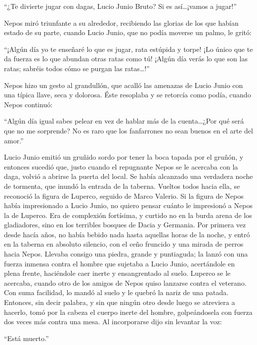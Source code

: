 \documentclass[11pt,openany]{book}
\begin{document}
“¿Te divierte jugar con dagas, Lucio Junio Bruto? Si es así\dots ¡vamos a jugar!” 

Nepos miró triunfante a su alrededor, recibiendo las glorias de los que habían estado de su parte, cuando Lucio Junio, que no podía moverse un palmo, le gritó: 

“¡Algún día yo te enseñaré lo que es jugar, rata estúpida y torpe! ¡Lo único que te da fuerza es lo que abundan otras ratas como tú! ¡Algún día verás lo que son las ratas; sabréis todos cómo se purgan las ratas\dots!” 

Nepos hizo un gesto al grandullón, que acalló las amenazas de Lucio Junio con una típica llave, seca y dolorosa. Éste resoplaba y se retorcía como podía, cuando Nepos continuó: 

“Algún día igual sabes pelear en vez de hablar más de la cuenta\dots ¿Por qué será que no me sorprende? No es raro que los fanfarrones no sean buenos en el arte del amor.” 

Lucio Junio emitió un gruñido sordo por tener la boca tapada por el gruñón, y entonces sucedió que, justo cuando el repugnante Nepos se le acercaba con la daga, volvió a abrirse la puerta del local. Se había alcanzado una verdadera noche de tormenta, que inundó la entrada de la taberna. Vueltos todos hacia ella, se reconoció la figura de Luperco, seguido de Marco Valerio. Si la figura de Nepos había impresionado a Lucio Junio, no quiero pensar cuánto le impresionó a Nepos la de Luperco. Era de complexión fortísima, y curtido no en la burda arena de los gladiadores, sino en los terribles bosques de Dacia y Germania. Por primera vez desde hacía años, no había bebido nada hasta aquellas horas de la noche, y entró en la taberna en absoluto silencio, con el ceño fruncido y una mirada de perros hacia Nepos. Llevaba consigo una piedra, grande y puntiaguda; la lanzó con una fuerza inmensa contra el hombre que sujetaba a Lucio Junio, acertándole en plena frente, haciéndole caer inerte y ensangrentado al suelo. Luperco se le acercaba, cuando otro de los amigos de Nepos quiso lanzarse contra el veterano. Con suma facilidad, lo mandó al suelo y le quebró la nariz de una patada. Entonces, sin decir palabra, y sin que ningún otro desde luego se atreviera a hacerlo, tomó por la cabeza el cuerpo inerte del hombre, golpeándosela con fuerza dos veces más contra una mesa. Al incorporarse dijo sin levantar la voz: 

“Está muerto.” 
\end{document}
